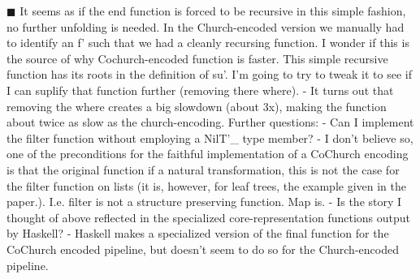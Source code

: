 $\blacksquare$
It seems as if the end function is forced to be recursive in this simple fashion, no further unfolding is needed. In the Church-encoded version we manually had to identify an f' such that we had a cleanly recursing function. I wonder if this is the source of why Cochurch-encoded function is faster.
This simple recursive function has its roots in the definition of su'. I'm going to try to tweak it to see if I can suplify that function further (removing there where).
- It turns out that removing the where creates a big slowdown (about 3x), making the function about twice as slow as the church-encoding.
Further questions:
- Can I implement the filter function without employing a NilT'\_ type member?
	- I don't believe so, one of the preconditions for the faithful implementation of a CoChurch encoding is that the original function if a natural transformation, this is not the case for the filter function on lists (it is, however, for leaf trees, the example given in the paper.). I.e. filter is not a structure preserving function. Map is.
- Is the story I thought of above reflected in the specialized core-representation functions output by Haskell?
	- Haskell makes a specialized version of the final function for the CoChurch encoded pipeline, but doesn't seem to do so for the Church-encoded pipeline.